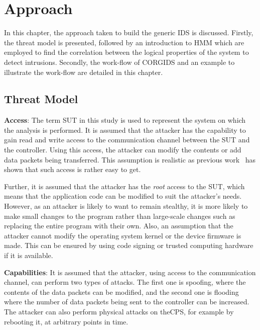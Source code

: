 
\chapter{\textbf{Approach}}
\label{sec3:Approach}

In this chapter, the approach taken to build the generic \ac{IDS} is discussed.
Firstly, the threat model is presented, followed by an introduction to \ac{HMM} which are employed to find the correlation between the logical properties of the system to detect intrusions. Secondly, the work-flow of \ac{CORGIDS} and an example to illustrate the work-flow are detailed in this chapter. 

\section{Threat Model}
\label{sec:threatModel}
{\bf Access}: The term \ac{SUT} in this study is used to represent the system on which the analysis is performed. It is assumed that the attacker has the capability to gain read and write access to the communication channel between the \ac{SUT} and the controller. Using this access, the attacker can modify the contents or add data packets being transferred. This assumption is realistic as previous work~\cite{ericsson2010cyber} has shown that such access is rather easy to get.

Further, it is assumed that the attacker has the \textit{root} access to the \ac{SUT}, which means that the application code can be modified to suit the attacker's needs. However, as an attacker is likely to want to remain stealthy, it is more likely to make small changes to the program rather than large-scale changes such as replacing the entire program with their own. Also, an assumption that the attacker cannot modify the operating system kernel or the device firmware is made. This can be ensured by using code signing or trusted computing hardware if it is available. 

{\bf Capabilities}: It is assumed that the attacker, using access to the communication channel, can perform two types of attacks. The first one is spoofing, where the contents of the data packets can be modified, and the second one is flooding where the number of data packets being sent to the controller can be increased. The attacker can also perform physical attacks on the\ac{CPS}, for example by rebooting it, at arbitrary points in time. 
 
